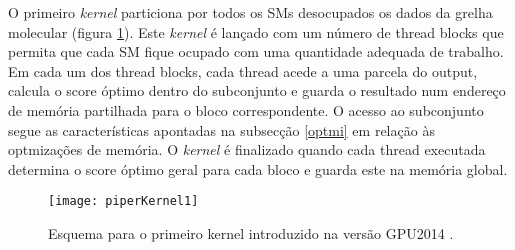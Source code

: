 O primeiro \textit{kernel} particiona por todos os SMs desocupados os dados da grelha molecular (figura \ref{k1piper}). Este \textit{kernel} é lançado com um número de thread blocks que permita que cada SM fique ocupado com uma quantidade adequada de trabalho. Em cada um dos thread blocks, cada thread acede a uma parcela do output, calcula o score óptimo dentro do subconjunto e guarda o resultado num endereço de memória partilhada para o bloco correspondente. O acesso ao subconjunto segue as características apontadas na subsecção \ref{optmi} em relação às optmizações de memória. O \textit{kernel} é finalizado quando cada thread executada determina o score óptimo geral para cada bloco e guarda este na memória global. \par
\begin{figure}[ht]
  \centering
    {\texttt{[image: piperKernel1]}}
  \caption{Esquema para o primeiro kernel introduzido na versão GPU2014 \cite{piper2014gpu}. }
  \label{k1piper}
\end{figure}
